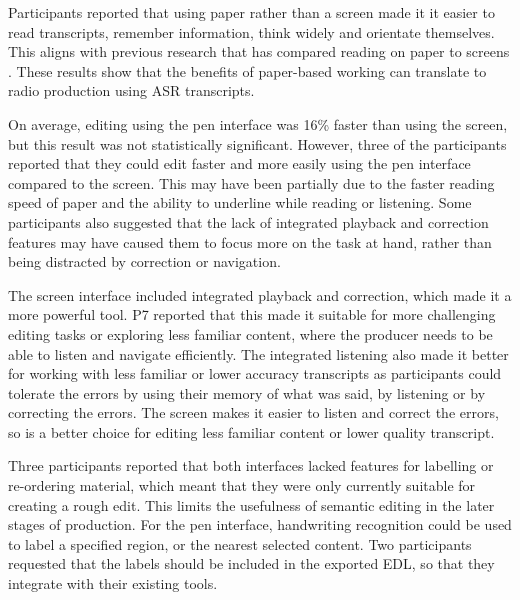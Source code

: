 Participants reported that using paper rather than a screen made it it easier to read transcripts, remember
information, think widely and orientate themselves. This aligns with previous research that has compared reading on
paper to screens \citep{OHara1997,Kurniawan2001,Mangen2013,Singer2017}. These results show that the benefits of
paper-based working can translate to radio production using ASR transcripts.

On average, editing using the pen interface was 16\% faster than using the screen, but this result was not
statistically significant.
However, three of the participants reported that they could edit faster and more easily using the pen interface compared to the
screen.
This may have been partially due to the faster reading speed of paper and the ability to underline while reading or
listening.  Some participants also suggested that the lack of integrated playback and correction features may have
caused them to focus more on the task at hand, rather than being distracted by correction or navigation.

The screen interface included integrated playback and correction, which made it a more powerful tool.  P7 reported that
this made it suitable for more challenging editing tasks or exploring less familiar content, where the producer needs
to be able to listen and navigate efficiently. The integrated listening also made it better for working with less
familiar or lower accuracy transcripts as participants could tolerate the errors by using their memory of what was
said, by listening or by correcting the errors. The screen makes it easier to listen and correct the errors, so is a
better choice for editing less familiar content or lower quality transcript. 


Three participants reported that both interfaces lacked features for labelling or re-ordering material, which meant
that they were only currently suitable for creating a rough edit. This limits the usefulness of semantic editing in the
later stages of production. For the pen interface, handwriting recognition could be used to label a specified region,
or the nearest selected content. Two participants requested that the labels should be included in the exported EDL, so
that they integrate with their existing tools.


